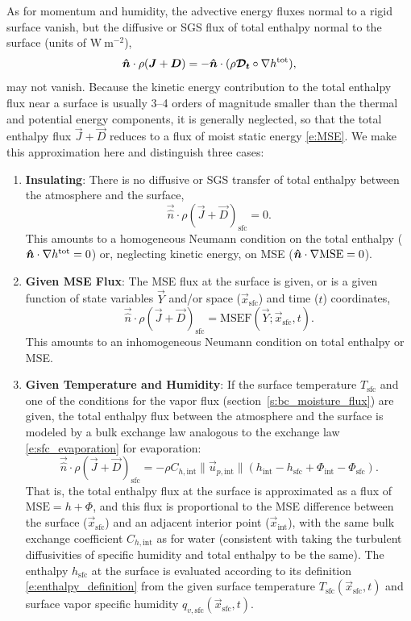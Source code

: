 \documentclass{report}
\begin{document}
As for momentum and humidity, the advective energy fluxes normal to a rigid surface vanish, but the diffusive or SGS flux of total enthalpy normal to the surface (units of $\mathrm{W~m^{-2}}$),
\[
\boldsymbol{{\hat n}} \cdot \rho (\boldsymbol{{J}} + \boldsymbol{{D}}) = -\boldsymbol{{\hat n}} \cdot (\rho \boldsymbol{{\mathcal{D}_t}} \circ \nabla h^{\mathrm{tot}}),
\]
may not vanish. Because the kinetic energy contribution to the total enthalpy flux near a surface is usually 3--4 orders of magnitude smaller than the thermal and potential energy components, it is generally neglected, so that the total enthalpy flux $\vec{J} + \vec{D}$ reduces to a flux of moist static energy \eqref{e:MSE}. We make this approximation here and distinguish three cases:
\begin{enumerate}
    \item \textbf{Insulating}: There is no diffusive or SGS transfer of total enthalpy between the atmosphere and the surface,
    \[
    \vec{\hat n} \cdot \rho (\vec{J} + \vec{D})_\mathrm{sfc} = 0.
    \]
    This amounts to a homogeneous Neumann condition on the total enthalpy ($\boldsymbol{{\hat n}} \cdot \nabla h^\mathrm{tot}=0$) or, neglecting kinetic energy, on MSE ($\boldsymbol{{\hat n}} \cdot \nabla \mathrm{MSE} =0$).
    \item \textbf{Given MSE Flux}: The MSE flux at the surface is given, or is a given function of state variables $\vec{Y}$ and/or space ($\vec{x}_\mathrm{sfc}$) and time ($t$) coordinates,
    \[
    \vec{\hat n} \cdot \rho (\vec{J} + \vec{D})_\mathrm{sfc} = \mathrm{MSEF}(\vec{Y}; \vec{x}_\mathrm{sfc}, t).
    \]
    This amounts to an inhomogeneous Neumann condition on total enthalpy or MSE.
    \item \textbf{Given Temperature and Humidity}: If the surface temperature $T_\mathrm{sfc}$ and one of the conditions for the vapor flux (section~\ref{s:bc_moisture_flux}) are given, the total enthalpy flux between the atmosphere and the surface is modeled by a bulk exchange law analogous to the exchange law \eqref{e:sfc_evaporation} for evaporation:
    \begin{equation}\label{e:sfc_energy_flux}
    \vec{\hat n} \cdot \rho (\vec{J} + \vec{D})_\mathrm{sfc} = -\rho C_{h, \mathrm{int}} \| \vec{u}_{p,\mathrm{int}} \| 
     \left( h_\mathrm{int} -h_\mathrm{sfc} + \Phi_\mathrm{int} -  \Phi_\mathrm{sfc} \right).
    \end{equation}
    That is, the total enthalpy flux at the surface is approximated as a flux of $\mathrm{MSE} =h + \Phi$, and this flux is proportional to the MSE difference between the surface ($\vec{x}_\mathrm{sfc}$) and an adjacent interior point ($\vec{x}_\mathrm{int}$), with the same bulk exchange coefficient $C_{h, \mathrm{int}}$ as for water (consistent with taking the turbulent diffusivities of specific humidity and total enthalpy to be the same). The enthalpy $h_\mathrm{sfc}$ at the surface is evaluated according to its definition \eqref{e:enthalpy_definition} from the given surface temperature $T_\mathrm{sfc}(\vec{x}_\mathrm{sfc}, t)$ and surface vapor specific humidity $q_{v, \mathrm{sfc}}(\vec{x}_\mathrm{sfc}, t)$. 
    

\end{enumerate}
\end{document}
